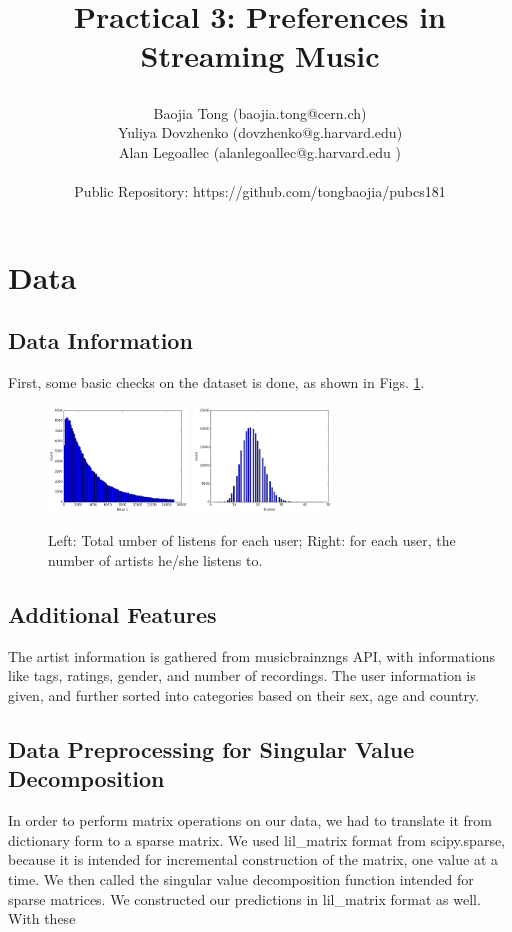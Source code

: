 \documentclass[11pt]{article}
\title{\begin{center}
{\Large Practical 3: Preferences in Streaming Music}
\end{center}}
\author{ Baojia Tong (baojia.tong@cern.ch)\\Yuliya Dovzhenko (dovzhenko@g.harvard.edu)\\Alan Legoallec (alanlegoallec@g.harvard.edu )\\\\Public Repository: https://github.com/tongbaojia/pubcs181}
\begin{document}
\maketitle{}
\section{Data}
\subsection{Data Information}
First, some basic checks on the dataset is done, as shown in Figs. \ref{Info}.
\begin{figure}[] 
\centering
        \includegraphics[width=0.33\textwidth]{Plots/Nmusic_count_zoom.png}
        \includegraphics[width=0.33\textwidth]{Plots/Nartist_count.png}
        \caption{Left: Total umber of listens for each user; Right: for each user, the number of artists he/she listens to.}
            \label{Info}
\end{figure}
\subsection{Additional Features}
The artist information is gathered from musicbrainzngs API, with informations like tags, ratings, gender, and number of recordings. The user information is given, and further sorted into categories based on their sex, age and country.

\subsection{Data Preprocessing for Singular Value Decomposition}
In order to perform matrix operations on our data, we had to translate it from dictionary form to a sparse matrix. We used lil\_matrix format from scipy.sparse, because it is intended for incremental construction of the matrix, one value at a time. We then called the singular value decomposition function intended for sparse matrices. We constructed our predictions in lil\_matrix format as well. With these 
\end{document}
